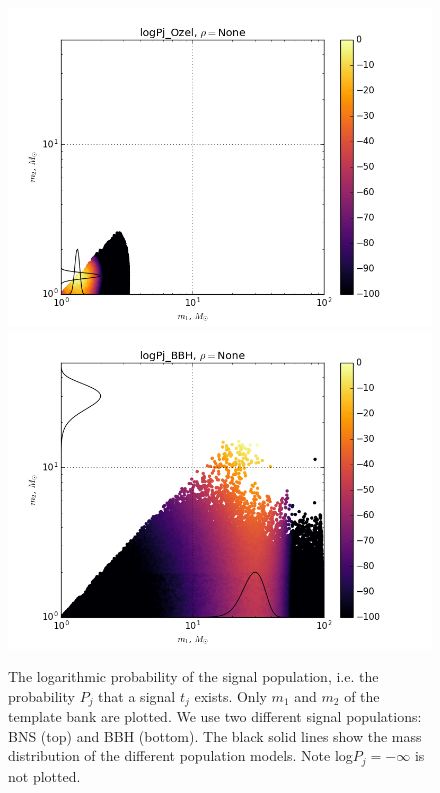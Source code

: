 \documentclass[twocolumn,showpacs,unsortedaddress,superscriptaddress,showkeys,nofootinbib,preprintnumbers,letterpaper]{revtex4-1}
\begin{document}
\begin{figure}
\resizebox{\linewidth}{!}
{\includegraphics{logPj_OzelrhoNone.png}}
\resizebox{\linewidth}{!}
{\includegraphics{logPj_BBHrhoNone.png}}
\caption{The logarithmic probability of the signal population, i.e. the probability $P_j$ that a signal $t_j$ exists. Only $m_1$ and $m_2$ of the template bank are plotted. We use two different signal populations: BNS (top) and BBH (bottom). The black solid lines show the mass distribution of the different population models. Note log$P_j=-\infty$ is not plotted.}
\label{fig:p_j}
\end{figure}

\end{document}

